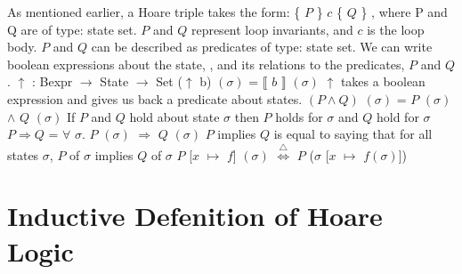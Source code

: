 \documentclass{lecturenotes}
\begin{document}
As mentioned earlier, a Hoare triple takes the form: \{ $P$ \} $c$ \{ $Q$ \} , where P and Q are of type: state \rightarrow \; set.
$P$ and $Q$ represent loop invariants, and $c$ is the loop body. $P$ and $Q$ can be described as predicates of type: state \rightarrow \; set.
We can write boolean expressions about the state, \sigma \; , and its relations to the predicates, $P$ and $Q$. \newline
\newline
$\uparrow$ : Bexpr $\rightarrow$ State $\rightarrow$ Set \newline
($\uparrow$ b) $(\sigma)$ = $\llbracket$ $b$ $\rrbracket$ $(\sigma)$ \newline
\newline
$\uparrow$ takes a boolean expression and gives us back a predicate about states. \newline
\newline
$(P \wedge Q)$ $(\sigma)$ = $P$ $(\sigma)$ $\wedge$ $Q$ $(\sigma)$ \newline
If $P$ and $Q$ hold about state $\sigma$ then $P$ holds for $\sigma$ and $Q$ hold for $\sigma$ \newline
\newline
$P \Rightarrow Q$ = $\forall$ $\sigma$. $P$ $(\sigma)$ $\Rightarrow$ $Q$ $(\sigma)$ \newline
$P$ implies $Q$ is equal to saying that for all states $\sigma$, $P$ of $\sigma$ implies $Q$ of $\sigma$ \newline
\newline
$P$ [$x$ $\mapsto$ $f$] $(\sigma)$ $\stackrel{\triangle}{\iff}$ $P$ ($\sigma$ [$x$ $\mapsto$ $f(\sigma)$]) \newline \newline


\section{Inductive Defenition of Hoare Logic}

\begin{mathpar}
\end{mathpar}

\begin{mathpar}
\end{mathpar}
\end{document}
